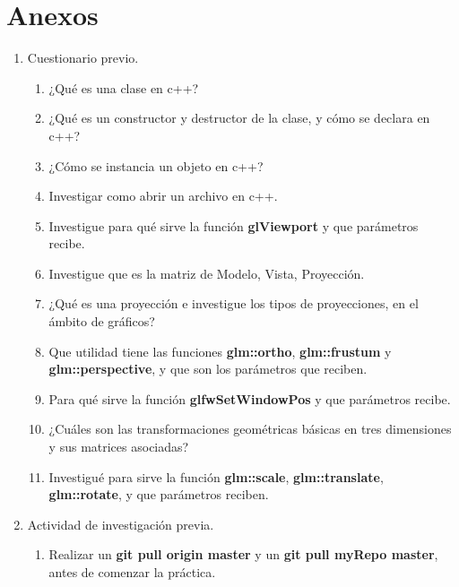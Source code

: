 \documentclass[11pt, english]{article}
\begin{document}
\section{Anexos}
\begin{enumerate}
\item Cuestionario previo.
\begin{enumerate}
\item ¿Qué es una clase en c++?
\item ¿Qué es un constructor y destructor de la clase, y cómo se declara en
c++?
\item ¿Cómo se instancia un objeto en c++?
\item Investigar como abrir un archivo en c++.
\item Investigue para qué sirve la función \textbf{glViewport} y que parámetros
recibe.
\item Investigue que es la matriz de Modelo, Vista, Proyección.
\item ¿Qué es una proyección e investigue los tipos de proyecciones, en el
ámbito de gráficos?
\item Que utilidad tiene las funciones \textbf{glm::ortho}, \textbf{glm::frustum} y
\textbf{glm::perspective}, y que son los parámetros que reciben.
\item Para qué sirve la función \textbf{glfwSetWindowPos} y que parámetros recibe.
\item ¿Cuáles son las transformaciones geométricas básicas en tres
dimensiones y sus matrices asociadas?
\item Investigué para sirve la función \textbf{glm::scale}, \textbf{glm::translate}, \textbf{glm::rotate},
y que parámetros reciben.
\end{enumerate}
\item Actividad de investigación previa.
\begin{enumerate}
\item Realizar un \textbf{git pull origin master} y un \textbf{git pull myRepo master}, antes de comenzar la práctica.
\end{enumerate}
\end{enumerate}

\end{document}
